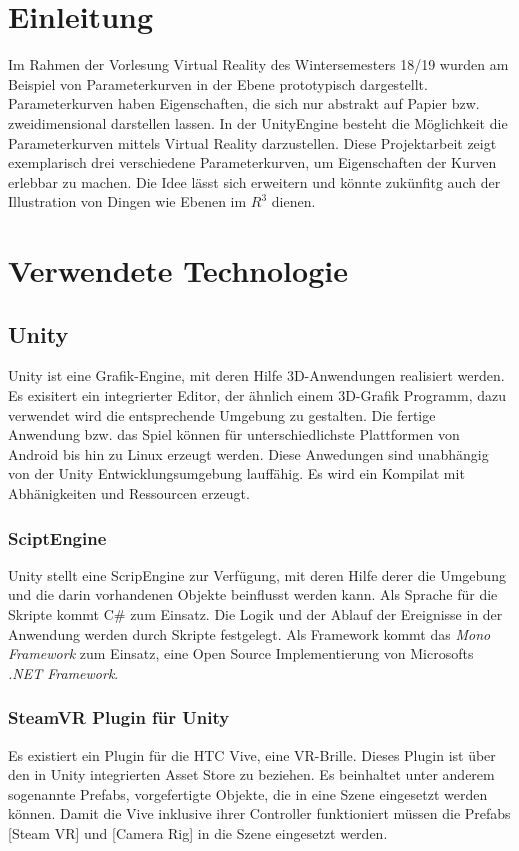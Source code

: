 
\chapter{Einleitung}
\label{Einleitung}

Im Rahmen der Vorlesung Virtual Reality des Wintersemesters 18/19 wurden am Beispiel von Parameterkurven in der Ebene prototypisch dargestellt.
Parameterkurven haben Eigenschaften, die sich nur abstrakt auf Papier bzw. zweidimensional darstellen lassen.
In der UnityEngine besteht die Möglichkeit die Parameterkurven mittels Virtual Reality darzustellen.  
Diese Projektarbeit zeigt exemplarisch drei verschiedene Parameterkurven, um Eigenschaften der Kurven erlebbar zu machen. 
Die Idee lässt sich erweitern und könnte zukünfitg auch der Illustration von Dingen wie Ebenen im $R^{3}$ dienen.

\chapter{Verwendete Technologie}
\label{Technologie}
\section{Unity}
Unity ist eine Grafik-Engine, mit deren Hilfe 3D-Anwendungen realisiert werden. Es exisitert ein integrierter Editor, der ähnlich einem 3D-Grafik Programm, dazu verwendet wird die entsprechende Umgebung zu gestalten. Die fertige Anwendung bzw. das Spiel können für unterschiedlichste Plattformen von Android bis hin zu Linux erzeugt werden. Diese Anwedungen sind unabhängig von der Unity Entwicklungsumgebung lauffähig. Es wird ein Kompilat mit Abhänigkeiten und Ressourcen erzeugt.

\subsection{SciptEngine}
Unity stellt eine ScripEngine zur Verfügung, mit deren Hilfe derer die Umgebung und die darin vorhandenen Objekte beinflusst werden kann. Als Sprache für die Skripte kommt C\# zum Einsatz. Die Logik und der Ablauf der Ereignisse in der Anwendung werden durch Skripte festgelegt. Als Framework kommt das \emph{Mono Framework} zum Einsatz, eine Open Source Implementierung von Microsofts \emph{.NET Framework}.

\subsection{SteamVR Plugin für Unity}
Es existiert ein Plugin für die HTC Vive, eine VR-Brille. Dieses Plugin ist über den in Unity integrierten Asset Store zu beziehen. Es beinhaltet unter anderem sogenannte Prefabs, vorgefertigte Objekte, die in eine Szene eingesetzt werden können. Damit die Vive inklusive ihrer Controller funktioniert müssen die Prefabs [Steam VR] und [Camera Rig] in die Szene eingesetzt werden. 


